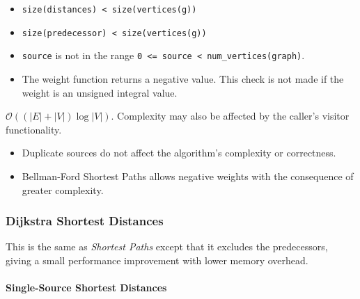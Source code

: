 \begin{itemdescr}
\begin{itemize}
                        \begin{itemize}
                              \item \lstinline{size(distances) < size(vertices(g))}
                              \item \lstinline{size(predecessor) < size(vertices(g))}
                              \item \lstinline{source} is not in the range \lstinline{0 <= source < num_vertices(graph)}.
                              \item The weight function returns a negative value. This check is not made if the weight
                                    is an unsigned integral value.
                        \end{itemize}
            \end{itemize}
      \pnum\complexity
                        $\mathcal{O}((|E| + |V|)\log{|V|})$. 
                        Complexity may also be affected by the caller's visitor functionality. \\
      \pnum\remarks 
            \begin{itemize}
                  \item Duplicate sources do not affect the algorithm's complexity or correctness.
                  \item Bellman-Ford Shortest Paths allows negative weights with the consequence of greater complexity.
            \end{itemize}
\end{itemdescr}


\subsubsection{Dijkstra Shortest Distances}
This is the same as \textit{Shortest Paths} except that it excludes the predecessors,
giving a small performance improvement with lower memory overhead.

\paragraph{Single-Source Shortest Distances}
{\small
      
}

